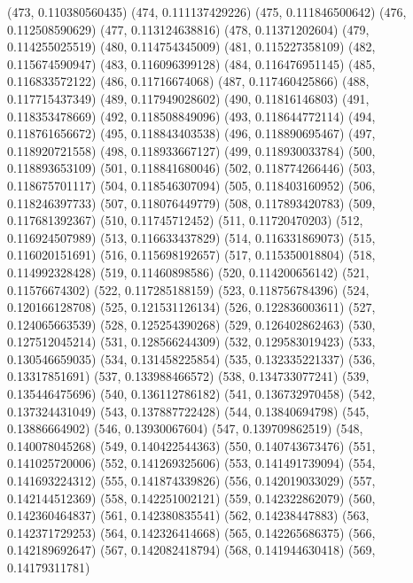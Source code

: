 {					(473, 0.110380560435)
					(474, 0.111137429226)
					(475, 0.111846500642)
					(476, 0.112508590629)
					(477, 0.113124638816)
					(478, 0.11371202604)
					(479, 0.114255025519)
					(480, 0.114754345009)
					(481, 0.115227358109)
					(482, 0.115674590947)
					(483, 0.116096399128)
					(484, 0.116476951145)
					(485, 0.116833572122)
					(486, 0.11716674068)
					(487, 0.117460425866)
					(488, 0.117715437349)
					(489, 0.117949028602)
					(490, 0.11816146803)
					(491, 0.118353478669)
					(492, 0.118508849096)
					(493, 0.118644772114)
					(494, 0.118761656672)
					(495, 0.118843403538)
					(496, 0.118890695467)
					(497, 0.118920721558)
					(498, 0.118933667127)
					(499, 0.118930033784)
					(500, 0.118893653109)
					(501, 0.118841680046)
					(502, 0.118774266446)
					(503, 0.118675701117)
					(504, 0.118546307094)
					(505, 0.118403160952)
					(506, 0.118246397733)
					(507, 0.118076449779)
					(508, 0.117893420783)
					(509, 0.117681392367)
					(510, 0.11745712452)
					(511, 0.11720470203)
					(512, 0.116924507989)
					(513, 0.116633437829)
					(514, 0.116331869073)
					(515, 0.116020151691)
					(516, 0.115698192657)
					(517, 0.115350018804)
					(518, 0.114992328428)
					(519, 0.11460898586)
					(520, 0.114200656142)
					(521, 0.11576674302)
					(522, 0.117285188159)
					(523, 0.118756784396)
					(524, 0.120166128708)
					(525, 0.121531126134)
					(526, 0.122836003611)
					(527, 0.124065663539)
					(528, 0.125254390268)
					(529, 0.126402862463)
					(530, 0.127512045214)
					(531, 0.128566244309)
					(532, 0.129583019423)
					(533, 0.130546659035)
					(534, 0.131458225854)
					(535, 0.132335221337)
					(536, 0.13317851691)
					(537, 0.133988466572)
					(538, 0.134733077241)
					(539, 0.135446475696)
					(540, 0.136112786182)
					(541, 0.136732970458)
					(542, 0.137324431049)
					(543, 0.137887722428)
					(544, 0.13840694798)
					(545, 0.13886664902)
					(546, 0.13930067604)
					(547, 0.139709862519)
					(548, 0.140078045268)
					(549, 0.140422544363)
					(550, 0.140743673476)
					(551, 0.141025720006)
					(552, 0.141269325606)
					(553, 0.141491739094)
					(554, 0.141693224312)
					(555, 0.141874339826)
					(556, 0.142019033029)
					(557, 0.142144512369)
					(558, 0.142251002121)
					(559, 0.142322862079)
					(560, 0.142360464837)
					(561, 0.142380835541)
					(562, 0.14238447883)
					(563, 0.142371729253)
					(564, 0.142326414668)
					(565, 0.142265686375)
					(566, 0.142189692647)
					(567, 0.142082418794)
					(568, 0.141944630418)
					(569, 0.14179311781)
}
